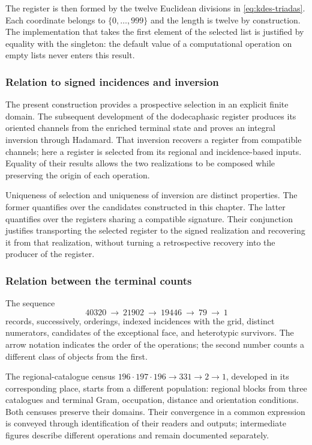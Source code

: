 The register is then formed by the twelve Euclidean divisions in
\eqref{eq:kdes-triadas}. Each coordinate belongs to
$\{0,\ldots,999\}$ and the length is twelve by construction. The
implementation that takes the first element of the selected list
is justified by equality with the singleton: the default value
of a computational operation on empty lists never enters
this result.

\subsubsection{Relation to signed incidences and inversion}

The present construction provides a prospective selection in an
explicit finite domain. The subsequent development of the dodecaphasic
register produces its oriented channels from the enriched terminal
state and proves an integral inversion through
Hadamard. That inversion recovers a register from compatible
channels; here a register is selected from its
regional and incidence-based inputs. Equality of their results
allows the two realizations to be composed while preserving the origin of each
operation.

Uniqueness of selection and uniqueness of inversion are distinct
properties. The former quantifies over the candidates constructed in this
chapter. The latter quantifies over the registers sharing a compatible
signature. Their conjunction justifies transporting the selected register
to the signed realization and recovering it from that realization, without
turning a retrospective recovery into the producer of the register.

\subsubsection{Relation between the terminal counts}

The sequence
\[
 40320\ \longrightarrow\ 21902\ \longrightarrow\ 19446
 \ \longrightarrow\ 79\ \longrightarrow\ 1
\]
records, successively, orderings, indexed incidences with the
grid, distinct numerators, candidates of the exceptional face, and
heterotypic survivors. The arrow notation indicates the order of
the operations; the second number counts a different class of objects
from the first.

The regional-catalogue census $196\cdot197\cdot196\longrightarrow331\longrightarrow2
\longrightarrow1$, developed in its corresponding place, starts from a different population: regional blocks from three catalogues and terminal Gram, occupation, distance and orientation conditions. Both censuses preserve their domains. Their convergence in a common expression is conveyed through identification of their readers and outputs; intermediate figures describe different operations and remain documented separately.

